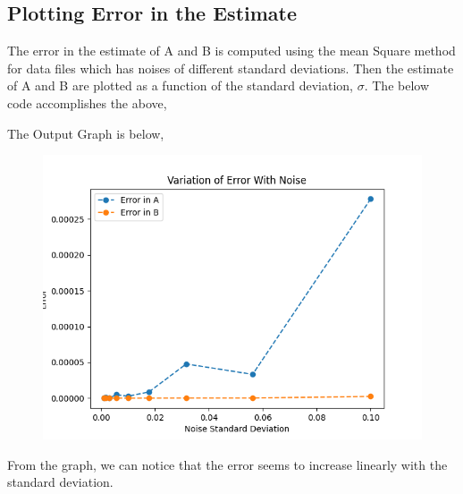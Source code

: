 \documentclass[12pt, a4paper]{report}
\begin{document}
\subsection{Plotting Error in the Estimate}
The error in the estimate of A and B is computed using the mean Square method for data files which has noises of different standard deviations. Then the estimate of A and B are plotted as a function of the standard deviation, $\sigma$. The below code accomplishes the above,
\vspace{5mm}
\noindent

\vspace{50mm}
The Output Graph is below,
\begin{figure}[h!]
    \centering
    \includegraphics[scale=0.8]{ErrorPLot.png} 
    \caption{}
    \label{fig:my_label}
\end{figure}
\vspace{1mm}

\noindent
From the graph, we can notice that the error seems to increase linearly with the standard deviation.\\
\end{document}
